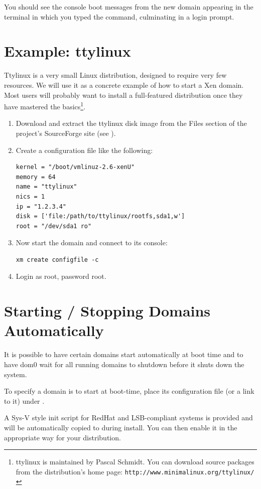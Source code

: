 \documentclass[11pt,twoside,final,openright]{report}
\begin{document}
You should see the console boot messages from the new domain 
appearing in the terminal in which you typed the command, 
culminating in a login prompt. 


\section{Example: ttylinux}

Ttylinux is a very small Linux distribution, designed to require very
few resources.  We will use it as a concrete example of how to start a
Xen domain.  Most users will probably want to install a full-featured
distribution once they have mastered the basics\footnote{ttylinux is
maintained by Pascal Schmidt. You can download source packages from
the distribution's home page: {\tt http://www.minimalinux.org/ttylinux/}}.

\begin{enumerate}
\item Download and extract the ttylinux disk image from the Files
section of the project's SourceForge site (see 
).
\item Create a configuration file like the following:
\begin{verbatim}
kernel = "/boot/vmlinuz-2.6-xenU"
memory = 64
name = "ttylinux"
nics = 1
ip = "1.2.3.4"
disk = ['file:/path/to/ttylinux/rootfs,sda1,w']
root = "/dev/sda1 ro"
\end{verbatim}
\item Now start the domain and connect to its console:
\begin{verbatim}
xm create configfile -c
\end{verbatim}
\item Login as root, password root.
\end{enumerate}


\section{Starting / Stopping Domains Automatically}

It is possible to have certain domains start automatically at boot
time and to have dom0 wait for all running domains to shutdown before
it shuts down the system.

To specify a domain is to start at boot-time, place its
configuration file (or a link to it) under .

A Sys-V style init script for RedHat and LSB-compliant systems is
provided and will be automatically copied to 
during install.  You can then enable it in the appropriate way for
your distribution.
\end{document}
